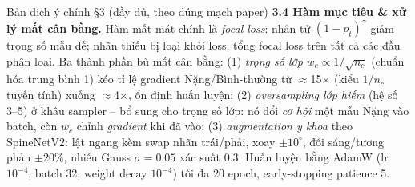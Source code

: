 \documentclass[12pt,a4paper]{article}
\begin{document}
\begin{dichbox}{Bản dịch ý chính §3 (đầy đủ, theo đúng mạch paper)}
\textbf{3.4 Hàm mục tiêu \& xử lý mất cân bằng.} Hàm mất mát chính là \emph{focal loss}: nhân tử $(1-p_t)^\gamma$ giảm trọng số mẫu dễ; nhãn thiếu bị loại khỏi loss; tổng focal loss trên tất cả các đầu phân loại. Ba thành phần bù mất cân bằng: (1) \emph{trọng số lớp} $w_c\propto1/\sqrt{n_c}$ (chuẩn hóa trung bình 1) kéo tỉ lệ gradient Nặng/Bình-thường từ $\approx$15$\times$ (kiểu $1/n_c$ tuyến tính) xuống $\approx$4$\times$, ổn định huấn luyện; (2) \emph{oversampling lớp hiếm} (hệ số 3--5) ở khâu sampler -- bổ sung cho trọng số lớp: nó đổi \emph{cơ hội} một mẫu Nặng vào batch, còn $w_c$ chỉnh \emph{gradient} khi đã vào; (3) \emph{augmentation y khoa} theo SpineNetV2: lật ngang kèm swap nhãn trái/phải, xoay $\pm10^\circ$, đổi sáng/tương phản $\pm20\%$, nhiễu Gauss $\sigma=0.05$ xác suất 0.3. Huấn luyện bằng AdamW (lr $10^{-4}$, batch 32, weight decay $10^{-4}$) tối đa 20 epoch, early-stopping patience 5.
\end{dichbox}
\end{document}
